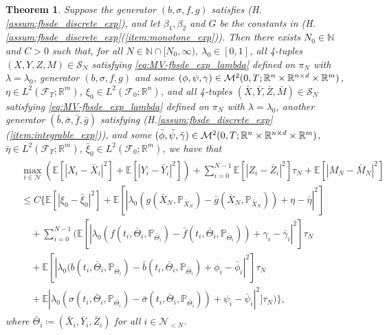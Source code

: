 \documentclass[11pt]{article}
\numberwithin{equation}{section}
\newtheorem{Theorem}{Theorem}[section]
\theoremstyle{definition}
\theoremstyle{remark}
\def\l{\label}  \def\f{\frac}  \def\fa{\forall}
\def\b{\beta}  \def\a{\alpha} \def\ga{\gamma}
\def\cF{\mathcal{F}}
\def\cM{\mathcal{M}}
\def\cN{\mathcal{N}}
\def\cS{\mathcal{S}}
\def\sE{{\mathbb{E}}}
\def\sN{{\mathbb{N}}}
\def\sP{\mathbb{P}}
\def\sR{{\mathbb R}}
\begin{document}
\begin{Theorem}\l{thm:stab_exp}
Suppose the generator $(b,\sigma,f,g)$ satisfies (H.\ref{assum:fbsde_discrete_exp}), 
and let $\b_1,\b_2$ and $G$ be the constants in  (H.\ref{assum:fbsde_discrete_exp}(\ref{item:monotone_exp})).
Then there exists $N_0\in \sN$  and $C>0$ such that,
 for all $N\in \sN\cap[ N_0,\infty)$, $\lambda_0\in [0,1]$,
all 4-tuples
$(X,Y, Z, M)\in 
\cS_N$
satisfying \eqref{eq:MV-fbsde_exp_lambda}
defined on  $\pi_N$ 
with 
$\lambda=\lambda_0$,
 generator $(b,\sigma,f,g)$ and some 
$(\phi,\psi,\gamma)\in \cM^2(0,T; \sR^n\t \sR^{n\t d}\t \sR^m)$, 
 $\eta\in L^2(\cF_T;\sR^m)$,
 $\xi_0\in L^2(\cF_0;\sR^n)$,
and 
all 4-tuples
$(\bar{X},\bar{Y}, \bar{Z}, \bar{M})\in 
\cS_N$
satisfying  \eqref{eq:MV-fbsde_exp_lambda}
defined on  $\pi_N$ 
with 
$\lambda=\lambda_0$,
another generator $(\bar{b},\bar{\sigma},\bar{f},\bar{g})$ 
satisfying 
(H.\ref{assum:fbsde_discrete_exp}(\ref{item:integrable_exp})),
 and some 
$(\bar{\phi},\bar{\psi},\bar{\gamma})\in \cM^2(0,T; \sR^n\t \sR^{n\t d}\t \sR^m)$, 
 $\bar{\eta}\in L^2(\cF_T;\sR^m)$,
  $\bar{\xi}_0\in L^2(\cF_0;\sR^m)$,
we have that
\begin{align*}
\begin{split}
&\max_{i\in \cN}
\left(
\sE[|{X}_{i}
-\bar{X}_{i}|^2]
+
\sE[|{Y}_{i}
-\bar{Y}_{i}|^2]
\right)
+
\sum_{i=0}^{N-1}
\sE
[
|{Z}_{i}
-\bar{Z}_{i}|^2]\tau_N
+
\sE[|{M}_{N}
-\bar{M}_{N}|^2]
\\
&\le
C\bigg\{
\sE[| \xi_{0}-\bar{\xi}_0|^2]
+
\sE[ |\lambda_0(g(\bar{X}_N,\sP_{\bar{X}_N})-\bar{g}(\bar{X}_N,\sP_{\bar{X}_N}))
+ \eta-\bar{\eta}|^2]
\\
&\quad
+\sum_{i=0}^{N-1}
\bigg(
\sE[|\lambda_0({f}(t_{i},\bar{\Theta}_i,\sP_{\bar{\Theta}_i})-\bar{f}(t_{i},\bar{\Theta}_i,\sP_{\bar{\Theta}_i}))+\gamma_i-\bar{\gamma}_i|^2]\tau_N
\\
&\quad
+
\sE[|\lambda_0({b}(t_{i},\bar{\Theta}_{i},\sP_{\bar{\Theta}_{i}})-\bar{b}(t_{i},\bar{\Theta}_{i},\sP_{\bar{\Theta}_{i}})+ \phi_{i}- \bar{\phi}_{i}|^2]\tau_N
\\
&
\quad 
+
\sE|\lambda_0({\sigma}(t_i,\bar{\Theta}_i,\sP_{\bar{\Theta}_i})-\bar{\sigma}(t_i,\bar{\Theta}_i,\sP_{\bar{\Theta}_i}))+\psi_{i}-\bar{\psi}_{i}|^2]\tau_N
\bigg)
\bigg\},
\end{split}
\end{align*}
where $\bar{\Theta}_i\coloneqq (\bar{X}_i,\bar{Y}_i, \bar{Z}_i)$ for all $i\in \cN_{<N}$.

\end{Theorem}
\end{document}
